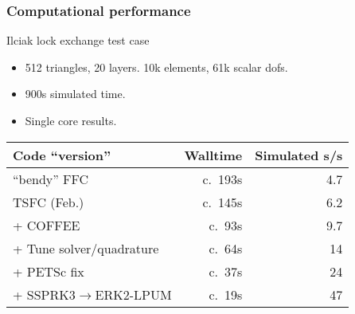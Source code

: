 \documentclass{beamer}
\begin{document}
\begin{frame}
  \frametitle{Computational performance}
  \begin{block}{Ilciak lock exchange test case}
    \begin{itemize}
    \item 512 triangles, 20 layers. 10k elements, 61k scalar dofs.
    \item 900s simulated time.
    \item Single core results.
    \end{itemize}
  \end{block}
{\small
  \begin{tabular}{lrr}
    Code ``version''               & Walltime & Simulated s/s \\
    \hline
    ``bendy'' FFC                  & c.~193s  & 4.7           \\
     TSFC (Feb.)                   & c.~145s  & 6.2           \\
    + COFFEE                       & c.~93s   & 9.7           \\
    + Tune solver/quadrature       & c.~64s   & 14            \\
    + PETSc fix                    & c.~37s   & 24            \\
    + SSPRK3$\rightarrow$ERK2-LPUM & c.~19s   & 47            \\
  \end{tabular}

}
\end{frame}
\end{document}
